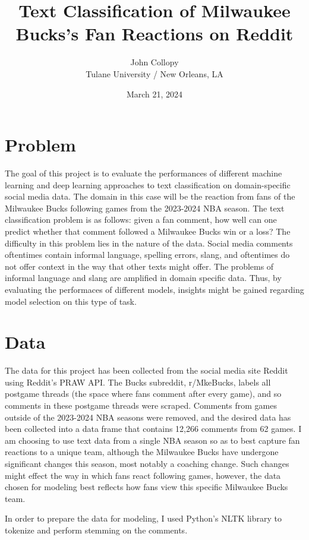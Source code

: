 \documentclass[11pt,a4paper]{article}
\title{Text Classification of Milwaukee Bucks's Fan Reactions on Reddit}
\author{John Collopy \\
  Tulane University / New Orleans, LA \\}
\date{March 21, 2024}
\begin{document}
\maketitle

\section{Problem}

The goal of this project is to evaluate the performances of different machine learning and deep learning approaches to text classification on domain-specific social media data. The domain in this case will be the reaction from fans of the Milwaukee Bucks following games from the 2023-2024 NBA season. The text classification problem is as follows: given a fan comment, how well can one predict whether that comment followed a Milwaukee Bucks win or a loss? The difficulty in this problem lies in the nature of the data. Social media comments oftentimes contain informal language, spelling errors, slang, and oftentimes do not offer context in the way that other texts might offer. The problems of informal language and slang are amplified in domain specific data. Thus, by evaluating the performaces of different models, insights might be gained regarding model selection on this type of task.

\section{Data}

The data for this project has been collected from the social media site Reddit using Reddit's PRAW API. The Bucks subreddit, r/MkeBucks, labels all postgame threads (the space where fans comment after every game), and so comments in these postgame threads were scraped. Comments from games outside of the 2023-2024 NBA seasons were removed, and the desired data has been collected into a data frame that contains 12,266 comments from 62 games. I am choosing to use text data from a single NBA season so as to best capture fan reactions to a unique team, although the Milwaukee Bucks have undergone significant changes this season, most notably a coaching change. Such changes might effect the way in which fans react following games, however, the data chosen for modeling best reflects how fans view this specific Milwaukee Bucks team.


In order to prepare the data for modeling, I used Python's NLTK library to tokenize and perform stemming on the comments.
\end{document}
